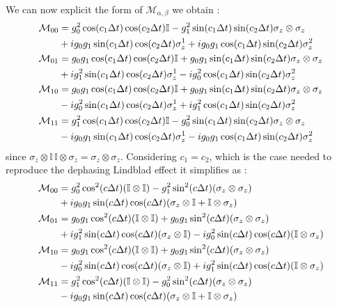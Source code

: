 \documentclass[a4paper,12pt]{article}
\begin{document}
We can now explicit the form of $ \mathcal{M}_{\alpha, \beta} $ we obtain :
\begin{align}
	\mathcal{M}_{00} &= g_0^2 \cos(c_1 \Delta t) \cos(c_2 \Delta t) \mathbb{I} - g_1^2 \sin(c_1 \Delta t) \sin(c_2 \Delta t) \sigma_z \otimes \sigma_z \notag \\
	&+ i g_0 g_1 \sin(c_1 \Delta t) \cos(c_2 \Delta t) \sigma_z^1 + i g_0 g_1 \cos(c_1 \Delta t) \sin(c_2 \Delta t) \sigma_z^2\\
	\mathcal{M}_{01} &= g_0 g_1 \cos(c_1 \Delta t) \cos(c_2 \Delta t) \mathbb{I} + g_0 g_1 \sin(c_1 \Delta t) \sin(c_2 \Delta t) \sigma_z \otimes \sigma_z \notag \\
	& + i g_1^2 \sin(c_1 \Delta t) \cos(c_2 \Delta t) \sigma_z^1 - i g_0^2 \cos(c_1 \Delta t) \sin(c_2 \Delta t) \sigma_z^2 \\
	\mathcal{M}_{10} &= g_0 g_1 \cos(c_1 \Delta t) \cos(c_2 \Delta t) \mathbb{I} + g_0 g_1 \sin(c_1 \Delta t) \sin(c_2 \Delta t) \sigma_z \otimes \sigma_z \notag \\
	& - i g_0^2 \sin(c_1 \Delta t) \cos(c_2 \Delta t) \sigma_z^1 + i g_1^2 \cos(c_1 \Delta t) \sin(c_2 \Delta t) \sigma_z^2 \\
	\mathcal{M}_{11} &= g_1^2 \cos(c_1 \Delta t) \cos(c_2 \Delta t) \mathbb{I} - g_0^2 \sin(c_1 \Delta t) \sin(c_2 \Delta t) \sigma_z \otimes \sigma_z \notag \\
	& - i g_0 g_1 \sin(c_1 \Delta t) \cos(c_2 \Delta t) \sigma_z^1 - i g_0 g_1 \cos(c_1 \Delta t) \sin(c_2 \Delta t) \sigma_z^2
\end{align}
since $ \sigma_z \otimes \mathbb{I} \, \mathbb{I} \otimes \sigma_z = \sigma_z \otimes \sigma_z $. Considering $ c_1 = c_2 $, which is the case needed to reproduce the dephasing Lindblad effect it simplifies as :
\begin{align}
	\mathcal{M}_{00} &= g_0^2 \cos^2(c \Delta t) (\mathbb{I} \otimes \mathbb{I}) - g_1^2 \sin^2(c \Delta t) (\sigma_z \otimes \sigma_z) \notag \\ 
	& + i g_0 g_1 \sin(c \Delta t) \cos(c \Delta t) (\sigma_z \otimes \mathbb{I} + \mathbb{I} \otimes \sigma_z ) \\
	\mathcal{M}_{01} &= g_0 g_1 \cos^2(c \Delta t) (\mathbb{I} \otimes \mathbb{I}) + g_0 g_1 \sin^2(c \Delta t) (\sigma_z \otimes \sigma_z) \notag \\
	& + i g_1^2 \sin(c \Delta t) \cos(c \Delta t) (\sigma_z \otimes \mathbb{I}) - i g_0^2 \sin(c \Delta t) \cos(c \Delta t) (\mathbb{I} \otimes \sigma_z) \\
	\mathcal{M}_{10} &= g_0 g_1 \cos^2(c \Delta t) (\mathbb{I} \otimes \mathbb{I})  + g_0 g_1 \sin^2(c \Delta t) (\sigma_z \otimes \sigma_z) \notag \\
	& - i g_0^2 \sin(c \Delta t) \cos(c \Delta t) (\sigma_z \otimes \mathbb{I}) + i g_1^2 \sin(c \Delta t) \cos(c \Delta t) (\mathbb{I} \otimes \sigma_z) \\
	\mathcal{M}_{11} &= g_1^2 \cos^2(c \Delta t) (\mathbb{I} \otimes \mathbb{I}) - g_0^2 \sin^2(c \Delta t) (\sigma_z \otimes \sigma_z) \notag \\
	& - i g_0 g_1 \sin(c \Delta t) \cos(c \Delta t) (\sigma_z \otimes \mathbb{I} + \mathbb{I} \otimes \sigma_z)
\end{align}
\end{document}
